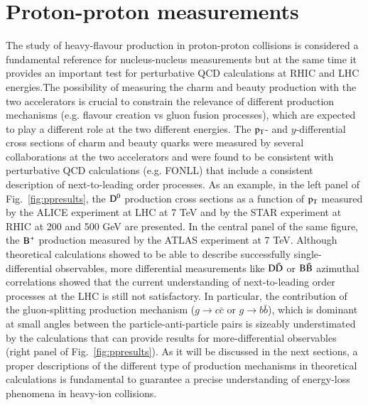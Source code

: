 \documentclass{webofc}
\begin{document}
\section{Proton-proton measurements}
\label{ppmeasurements}
The study of heavy-flavour production in proton-proton collisions is considered a fundamental reference for nucleus-nucleus measurements but at the same time it provides
an important test for perturbative QCD calculations at RHIC and LHC energies.The possibility of measuring the charm and beauty production with the two accelerators is crucial to constrain the relevance 
of different production mechanisms (e.g. flavour creation vs gluon fusion processes), which are expected to play a different role at the two different energies. The $\rm p_{\rm T} $- and $y$-differential cross sections of charm and beauty quarks were 
measured by several collaborations at the two accelerators and were found to be consistent with perturbative QCD calculations (e.g. FONLL) that include a consistent description of next-to-leading order processes. 
As an example, in the left panel of Fig.~\ref{fig:ppresults}, the $\rm D^{0}$ production cross sections as a function of $\rm p_{\rm T} $ measured by the ALICE experiment at LHC at 7 TeV and by the STAR experiment at RHIC at 200 and 500 GeV are presented. 
In the central panel of the same figure, the $\rm B^{+}$ production measured by the ATLAS  experiment at 7 TeV. Although theoretical calculations showed to be able to describe successfully single-differential 
observables, more differential measurements like $\rm D \bar{D}$ or $\rm B \bar{B}$ azimuthal correlations showed that the current understanding of next-to-leading order processes at the LHC is still not satisfactory. In particular, 
the contribution of the gluon-splitting production mechanism ($g \rightarrow c\bar{c}$ or $g \rightarrow b\bar{b}$), which is dominant at small angles between the particle-anti-particle pairs is 
sizeably understimated by the calculations that can provide results for more-differential observables (right panel of Fig.~\ref{fig:ppresults}). As it will be discussed in the next sections, a proper descriptions of the different type of production 
mechanisms in theoretical calculations is fundamental to guarantee a precise understanding of energy-loss phenomena in heavy-ion collisions. 
\end{document}
